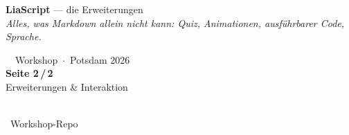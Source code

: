 \documentclass[a4paper,landscape,9pt]{extarticle}
\begin{document}
\noindent\begin{tcolorbox}[
  enhanced, frame hidden, sharp corners,
  colback=liagreen, coltext=white,
  left=12pt, right=8pt, top=4pt, bottom=4pt,
  before skip=0pt, after skip=4pt,
  width=\linewidth,
  borderline west={4pt}{-4pt}{liagreen!55}
]
\begin{minipage}[c]{0.66\linewidth}
  {\sffamily\fontsize{26}{28}\selectfont\bfseries LiaScript}\hspace{0.4em}%
  {\sffamily\large\color{white!75} — die Erweiterungen}\\[2pt]
  {\sffamily\footnotesize\itshape\color{white!90} Alles, was Markdown allein nicht kann: Quiz, Animationen, ausführbarer Code, Sprache.}
\end{minipage}\hfill
\begin{minipage}[c]{0.20\linewidth}\raggedright
  {\sffamily\scriptsize\color{white!85}\faGraduationCap~~Workshop~$\cdot$~Potsdam 2026}\\[2pt]
  {\sffamily\bfseries\normalsize Seite 2\,/\,2}\\[1pt]
  {\sffamily\scriptsize\color{white!75} Erweiterungen \& Interaktion}
\end{minipage}\hfill
\begin{minipage}[c]{0.10\linewidth}\centering
  {\color{black}\colorbox{white}{\hspace{1pt}\hspace{1pt}}}\\[1pt]
  {\sffamily\scriptsize\color{white!90}\faGithub~Workshop-Repo}
\end{minipage}
\end{tcolorbox}

\newcommand{\aufglia}[1]{\hfill{\sffamily\scriptsize\color{white!85}\faTasks~A#1}}
\end{document}
